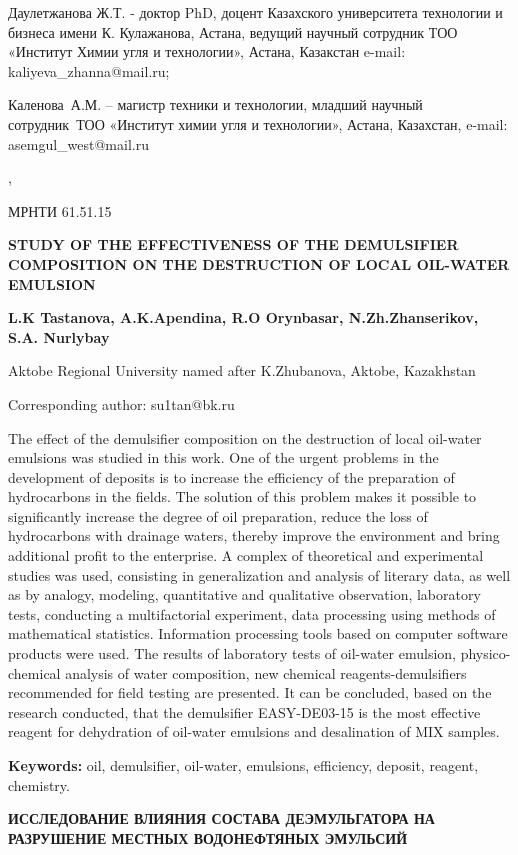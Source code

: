 Даулетжанова Ж.Т. - доктор PhD, доцент Казахского университета
технологии и бизнеса имени К. Кулажанова, Астана, ведущий научный
сотрудник ТОО «Институт Химии угля и технологии», Астана, Казакстан
e-mail: kaliyeva\_zhanna@mail.ru;

Каленова~А.М. -- магистр техники и технологии, младший научный
сотрудник~ТОО «Институт химии угля и технологии», Астана, Казахстан,
e-mail: asemgul\_west@mail.ru~ ~

,

МРНТИ 61.51.15

\textbf{STUDY OF THE EFFECTIVENESS OF THE DEMULSIFIER COMPOSITION ON THE
DESTRUCTION OF LOCAL OIL-WATER EMULSION}

\textbf{L.K Tastanova, A.K.Apendina, R.O Orynbasar, N.Zh.Zhanserikov,
S.A. Nurlybay}

Aktobe Regional University named after K.Zhubanova, Aktobe, Kazakhstan

Corresponding author: su1tan@bk.ru

The effect of the demulsifier composition on the destruction of local
oil-water emulsions was studied in this work. One of the urgent problems
in the development of deposits is to increase the efficiency of the
preparation of hydrocarbons in the fields. The solution of this problem
makes it possible to significantly increase the degree of oil
preparation, reduce the loss of hydrocarbons with drainage waters,
thereby improve the environment and bring additional profit to the
enterprise. A complex of theoretical and experimental studies was used,
consisting in generalization and analysis of literary data, as well as
by analogy, modeling, quantitative and qualitative observation,
laboratory tests, conducting a multifactorial experiment, data
processing using methods of mathematical statistics. Information
processing tools based on computer software products were used. The
results of laboratory tests of oil-water emulsion, physico-chemical
analysis of water composition, new chemical reagents-demulsifiers
recommended for field testing are presented. It can be concluded, based
on the research conducted, that the demulsifier EASY-DE03-15 is the most
effective reagent for dehydration of oil-water emulsions and
desalination of MIX samples.

\textbf{Keywords:} oil, demulsifier, oil-water, emulsions, efficiency,
deposit, reagent, chemistry.

\textbf{ИССЛЕДОВАНИЕ ВЛИЯНИЯ СОСТАВА ДЕЭМУЛЬГАТОРА НА РАЗРУШЕНИЕ МЕСТНЫХ
ВОДОНЕФТЯНЫХ ЭМУЛЬСИЙ}

